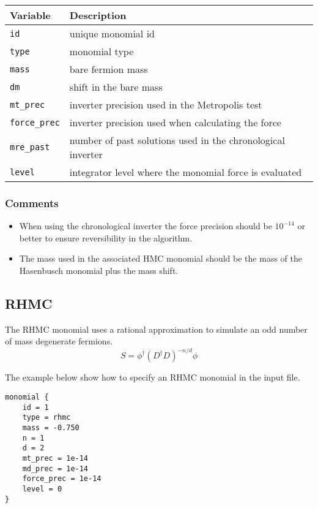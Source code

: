 \documentclass[12pt]{article}
\begin{document}
\vspace{2mm}

\begin{center}
\begin{tabular}{l|l}
 Variable & Description \\
 \hline
 \verb|id|         & unique monomial id \\
 \verb|type|       & monomial type \\
 \verb|mass|       & bare fermion mass \\
 \verb|dm|         & shift in the bare mass \\
 \verb|mt_prec|    & inverter precision used in the Metropolis test \\
 \verb|force_prec| & inverter precision used when calculating the force \\
 \verb|mre_past|   & number of past solutions used in the chronological inverter \\
 \verb|level|      & integrator level where the monomial force is evaluated
\end{tabular}
\end{center}

\vspace{2mm}
\subsubsection*{Comments}
\begin{itemize}
 \item When using the chronological inverter the force precision should be $10^{-14}$ or better to ensure reversibility in the algorithm.
 \item The mass used in the associated HMC monomial should be the mass of the Hasenbusch monomial plus the mass shift.
\end{itemize}


\newpage
\subsection*{RHMC}
The RHMC monomial uses a rational approximation to simulate an odd number of mass degenerate fermions.
\begin{equation}
 S = \phi^\dagger(D^\dagger D)^{-n/d}\phi
\end{equation}

The example below show how to specify an RHMC monomial in the input file.
\begin{center}
\begin{minipage}{55mm}
\begin{framed}
\begin{verbatim}
monomial {
    id = 1
    type = rhmc
    mass = -0.750
    n = 1
    d = 2
    mt_prec = 1e-14
    md_prec = 1e-14
    force_prec = 1e-14
    level = 0
}
\end{verbatim}
\vspace{-5mm}
\end{framed}
\end{minipage}
\end{center}
\end{document}
